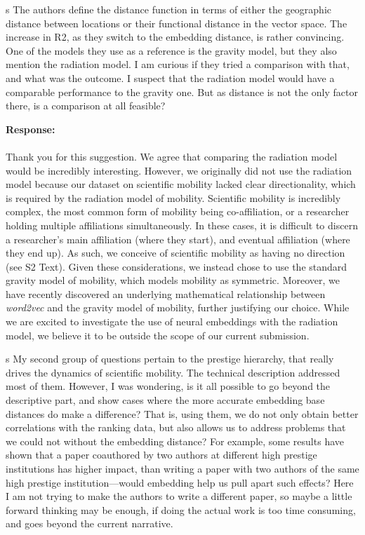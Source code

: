 \documentclass[12pt,draft,a4paper]{article}
\newcounter{comment}[subsection]
\newcommand{\response}[1]{{\noindent \textbf{Response:} \\ \\ \noindent #1}}
\newcommand{\rcomment}[1]{%
\vspace{10pt}
\begin{sectionbox}
s #1
\end{sectionbox}
}
\begin{document}
\rcomment{
	The authors define the distance function in terms of either the geographic distance between locations or their functional distance in the vector space. The increase in R2, as they switch to the embedding distance, is rather convincing. One of the models they use as a reference is the gravity model, but they also mention the radiation model. I am curious if they tried a comparison with that, and what was the outcome. I suspect that the radiation model would have a comparable performance to the gravity one. But as distance is not the only factor there, is a comparison at all feasible?
}

\response{Thank you for this suggestion.
	We agree that comparing the radiation model would be incredibly interesting.
	However, we originally did not use the radiation model because our dataset on scientific mobility lacked clear directionality, which is required by the radiation model of mobility.
	Scientific mobility is incredibly complex, the most common form of mobility being co-affiliation, or a researcher holding multiple affiliations simultaneously.
	In these cases, it is difficult to discern a researcher's main affiliation (where they start), and eventual affiliation (where they end up).
	As such, we conceive of scientific mobility as having no direction (see S2 Text).
	Given these considerations, we instead chose to use the standard gravity model of mobility, which models mobility as symmetric.
	Moreover, we have recently discovered an underlying mathematical relationship between \textit{word2vec} and the gravity model of mobility, further justifying our choice.
	While we are excited to investigate the use of neural embeddings with the radiation model, we believe it to be outside the scope of our current submission.
}

\rcomment{
	My second group of questions pertain to the prestige hierarchy, that really drives the dynamics of scientific mobility. The technical description addressed most of them. However, I was wondering, is it all possible to go beyond the descriptive part, and show cases where the more accurate embedding base distances do make a difference? That is, using them, we do not only obtain better correlations with the ranking data, but also allows us to address problems that we could not without the embedding distance? For example, some results have shown that a paper coauthored by two authors at different high prestige institutions has higher impact, than writing a paper with two authors of the same high prestige institution—would embedding help us pull apart such effects? Here I am not trying to make the authors to write a different paper, so maybe a little forward thinking may be enough, if doing the actual work is too time consuming, and goes beyond the current narrative.
}
\end{document}
